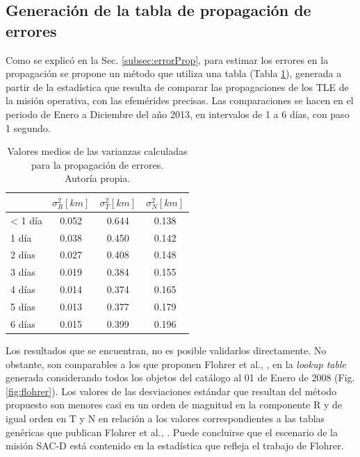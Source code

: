 \subsection*{Generaci\'on de la tabla de propagaci\'on de errores}

Como se explic\'o en la Sec. \ref{subsec:errorProp}, para estimar los errores en la propagaci\'on se propone un m\'etodo que utiliza una tabla (Tabla \ref{tab:resultatabla}), generada a partir de la estad\'istica que resulta de comparar las propagaciones de los TLE de la misi\'on operativa, con las efem\'erides precisas. Las comparaciones se hacen en el periodo de Enero a Diciembre del a\~no 2013, en intervalos de 1 a 6 d\'ias, con paso 1 segundo.

\begin{table}[!h]
\caption[Tabla con los valores medios para la propagaci\'on de errores.]{Valores medios de las varianzas calculadas\\ para la propagaci\'on de errores.\\ Autor\'ia propia.}
\begin{tabular}{lccc}
\hline \hline
\rowcolor{yellow!35}
&$\sigma^{2}_R [km]$ &$\sigma^{2}_T [km]$ &$\sigma^{2}_N [km]$\\
\hline \hline
< 1 d\'ia & 0.052& 0.644& 0.138\\
\hline
1 d\'ia & 0.038& 0.450& 0.142\\
\hline
2 d\'ias & 0.027& 0.408& 0.148\\
\hline
3 d\'ias & 0.019& 0.384& 0.155\\
\hline
4 d\'ias & 0.014& 0.374& 0.165\\
\hline
5 d\'ias & 0.013& 0.377& 0.179\\
\hline
6 d\'ias & 0.015& 0.399& 0.196\\
\hline
\end{tabular}
\label{tab:resultatabla}
\end{table}

Los resultados que se encuentran, no es posible validarlos directamente. No obstante, son comparables a los que proponen Flohrer et al., \citep{flohrer2008assessment}, en la {\it{lookup table}} generada considerando todos los objetos del cat\'alogo al 01 de Enero de 2008 (Fig.  \ref{fig:flohrer}). Los valores de las desviaciones est\'andar que resultan del m\'etodo propuesto son menores casi en un orden de magnitud en la componente R y de igual orden en T y N en relaci\'on a los valores correspondientes a las tablas gen\'ericas que publican Flohrer et al., \citep{flohrer2008assessment}. Puede concluirse que el escenario de la misi\'on SAC-D est\'a contenido en la estad\'istica que refleja el trabajo de Flohrer. 

